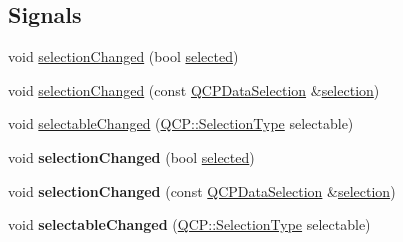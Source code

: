 \subsection*{Signals}
\begin{DoxyCompactItemize}
\item 
void \hyperlink{class_q_c_p_abstract_plottable_a3af66432b1dca93b28e00e78a8c7c1d9}{selection\+Changed} (bool \hyperlink{class_q_c_p_abstract_plottable_ab901903adcb0e29467d63de72340ab29}{selected})
\item 
void \hyperlink{class_q_c_p_abstract_plottable_a787a9c39421059006891744b731fa473}{selection\+Changed} (const \hyperlink{class_q_c_p_data_selection}{Q\+C\+P\+Data\+Selection} \&\hyperlink{class_q_c_p_abstract_plottable_a6fcea502826afbaab2568bd3ebc61b4b}{selection})
\item 
void \hyperlink{class_q_c_p_abstract_plottable_a663b1a44123c8340ac041a29d1e2c973}{selectable\+Changed} (\hyperlink{namespace_q_c_p_ac6cb9db26a564b27feda362a438db038}{Q\+C\+P\+::\+Selection\+Type} selectable)
\item 
void {\bfseries selection\+Changed} (bool \hyperlink{class_q_c_p_abstract_plottable_ab901903adcb0e29467d63de72340ab29}{selected})\hypertarget{class_q_c_p_abstract_plottable_a3af66432b1dca93b28e00e78a8c7c1d9}{}\label{class_q_c_p_abstract_plottable_a3af66432b1dca93b28e00e78a8c7c1d9}

\item 
void {\bfseries selection\+Changed} (const \hyperlink{class_q_c_p_data_selection}{Q\+C\+P\+Data\+Selection} \&\hyperlink{class_q_c_p_abstract_plottable_a6fcea502826afbaab2568bd3ebc61b4b}{selection})\hypertarget{class_q_c_p_abstract_plottable_a787a9c39421059006891744b731fa473}{}\label{class_q_c_p_abstract_plottable_a787a9c39421059006891744b731fa473}

\item 
void {\bfseries selectable\+Changed} (\hyperlink{namespace_q_c_p_ac6cb9db26a564b27feda362a438db038}{Q\+C\+P\+::\+Selection\+Type} selectable)\hypertarget{class_q_c_p_abstract_plottable_a663b1a44123c8340ac041a29d1e2c973}{}\label{class_q_c_p_abstract_plottable_a663b1a44123c8340ac041a29d1e2c973}

\end{DoxyCompactItemize}
